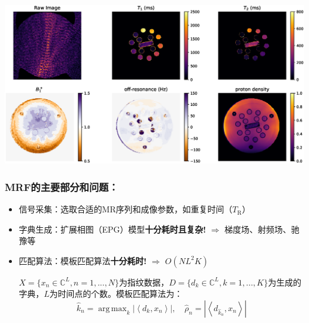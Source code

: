 \documentclass{beamer}
\DeclareMathOperator*{\argmax}{arg\,max}
\begin{document}

\begin{frame}
\hspace{-1.5cm}
	\begin{minipage}{1\textwidth}
		\centering
		\includegraphics[width=1.2\textwidth]{../img/intro/mrfmap}
	\end{minipage}
\end{frame}

\begin{frame}
	\frametitle{MRF的主要部分和问题：}
	\begin{itemize}
		\item 信号采集：选取合适的MR序列和成像参数，如重复时间（$T_\mathrm{R}$）
		\item 字典生成：扩展相图（EPG）模型\textbf{十分耗时且复杂!} $\Rightarrow$ 梯度场、射频场、驰豫等
		\item 匹配算法：模板匹配算法\textbf{十分耗时!} $\Rightarrow$ $O(NL^2K)$
		
		$X=\{x_n\in \mathbb{C}^L, n=1,...,N\}$为指纹数据，$D=\{d_k\in \mathbb{C}^L,k=1,...,K\}$为生成的字典，$L$为时间点的个数。模板匹配算法为：
			\begin{equation*}
	\hat{k}_n = \argmax_k \left|\left\langle d_k,x_n \right\rangle \right|,\quad
	\hat{\rho}_n= \left|\left\langle d_{\hat{k}_n},x_n \right\rangle \right|
	\end{equation*}
	\end{itemize}
	
\end{frame}
\end{document}
